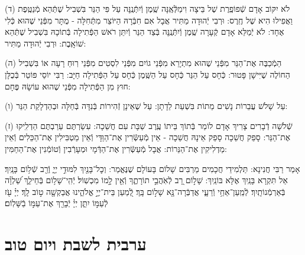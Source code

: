 \documentclass[twoside, openany, parskip=half, 11pt]{book}
\begin{document}
(ד) לֹא יִקּוֹב אָדָם שְֿׁפוֹפֶֽרֶת שֶׁל בֵּיצָה וִימַלְּֿאֶֽנָּה שֶֽׁמֶן וְֿיִתְּֿנֶֽנָּה עַל פִּי הַנֵּר בִּשְׁבִיל שֶׁתְּֿהֵא מְֿנַטֶּֽפֶת וַאֲפִילוּ הִיא שֶׁל חֶֽרֶס: וּרְבִי יְֿהוּדָה מַתִּיר אֲבָל אִם חִבְּֿרָהּ הַיּוֹצֵר מִתְּֿחִלָּה - מֻתָּר מִפְּֿנֵי שֶׁהוּא כְּֿלִי אֶחָד: לֹא יְֿמַלֵּא אָדָם קְֿעָרָה שֶֽׁמֶן וְֿיִתְּֿנֶֽנָּה בְּֿצַד הַנֵּר וְֿיִתֵּן רֹאשׁ הַפְּֿתִילָה בְּֿתוֹכָהּ בִּשְׁבִיל שֶׁתְּֿהֵא שׁוֹאָֽבֶת: וּרְבִי יְֿהוּדָה מַתִּיר:

(ה) הַמְֿכַבֶּה אֶת־הַנֵּר מִפְּֿנֵי שֶׁהוּא מִתְיָרֵא מִפְּֿנֵי גוֹיִם מִפְּֿנֵי לִסְטִים מִפְּֿנֵי רֽוּחַ רָעָה אוֹ בִּשְׁבִיל הַחוֹלֶה שֶׁיִּישָׁן פָּטוּר: כְּֿחָס עַל הַנֵּר כְּֿחָס עַל הַשֶּֽׁמֶן כְּֿחָס עַל הַפְּֿתִילָה חַיָּב: רַבִּי יוֹסֵי פּוֹטֵר בְּֿכֻלָּן חוּץ מִן הַפְּֿתִילָה מִפְּֿנֵי שֶׁהוּא עוֹשָׂהּ פֶּחָם:

(ו) עַל שָׁלֹשׁ עֲבֵרוֹת נָשִׁים מֵתוֹת בִּשְׁעַת לֵדָתָן: עַל שֶׁאֵינָן זְֿהִירוֹת בְּֿנִדָּה בְּֿחַלָּה וּבְהַדְלָקַת הַנֵּר:

(ז) שְֿׁלֹשָׁה דְֿבָרִים צָרִיךְ אָדָם לוֹמַר בְּֿתוֹךְ בֵּיתוֹ עֶֽרֶב שַׁבָּת עִם חֲשֵׁכָה: עִשַׂרְתֶּם עֵרַבְתֶּם הַדְלִֽיקוּ אֶת־הַנֵּר: סָפֵק חֲשֵׁכָה סָפֵק אֵינָהּ חֲשֵׁכָה - אֵין מְֿעַשְּֿׂרִין אֶת־הַוַּדָּי וְֿאֵין מַטְבִּילִין אֶת־הַכֵּלִים וְֿאֵין מַדְלִיקִין אֶת־הַנֵּרוֹת: אֲבָל מְֿעַשְּֿׂרִין אֶת־הַדְּֿמָי וּמְעָרְֿבִין וְֿטוֹמְֿנִין אֶת־הַחַמִּין:


 
אָמַר רַבִּי חֲנִינָא: תַּלְמִידֵי חֲכָמִים מַרְבִּים שָׁלוֹם בָּעוֹלָם שֶׁנֶּאֱמַר:
וְכׇל־בָּנַ֖יִךְ לִמּוּדֵ֣י יְיָ֑ וְֿרַ֖ב שְֿׁל֥וֹם בָּנָֽיִךְ׃ אַל תִּקְרָא בָּנַֽיִךְ אֶלָּא בּוֹנַֽיִךְ: שָׁל֣וֹם רָ֭ב לְֿאֹֽהֲבֵ֣י תוֹרָתֶ֑ךָ וְֿאֵ֖ין לָ֣מוֹ מִכְשֽׁוֹל׃ יְֿהִֽי־שָׁל֥וֹם בְּֿחֵילֵ֑ךְ שַׁ֝לְוָ֗ה בְּֿאַרְמְֿנוֹתָֽיִךְ׃ לְֿמַֽעַן־אַחַ֥י וְֿרֵעָ֑י אֲדַבְּֿרָה־נָּ֖א שָׁל֣וֹם בָּֽךְ׃ לְֿ֭מַעַן בֵּית־יְיָ֣ אֱלֹהֵ֑ינוּ אֲבַקְשָׁ֖ה ט֣וֹב לָֽךְ׃
יְיָ֗ עֹ֖ז לְֿעַמּ֣וֹ יִתֵּ֑ן יְיָ֓ יְֿבָרֵ֖ךְ אֶת־עַמּ֣וֹ בַֿשָּׁלֽוֹם׃


\mournerskaddish

\vspace{\baselineskip}

{\let\clearpage\relax
\chapter[ערבית לשבת ויו״ט]{ ערבית לשבת ויום טוב }}
\newcommand{\hamaarivaravim}{
	\firstword{בָּרוּךְ}
	אַתָּה יְיָ אֱלֹהֵֽינוּ מֶֽלֶךְ הָעוֹלָם אֲשֶׁר בִּדְבָרוֹ מַעֲרִיב עֲרָבִים בְּֿחׇכְמָה פּוֹתֵֽחַ שְֿׁעָרִים וּבִתְבוּנָה מְֿשַׁנֶּה עִתִּים וּמַחֲלִיף אֶת־הַזְּֿמַנִּים וּמְסַדֵּר אֶת־הַכּוֹכָבִים בְּֿמִשְׁמְֿרוֹתֵֽיהֶם בָּרָקִֽיעַ כִּרְצוֹנוֹ: בּוֹרֵא יוֹם וָלָֽיְֿלָה גּוֹלֵל אוֹר מִפְּֿנֵי חֹֽשֶׁךְ וְֿחֹֽשֶׁךְ מִפְּֿנֵי אוֹר: וּמַעֲבִיר יוֹם וּמֵֽבִיא לָֽיְֿלָה וּמַבְדִּיל בֵּין יוֹם וּבֵין לָֽיְֿלָה יְיָ צְֿבָאוֹת שְֿׁמוֹ: אֵל חַי וְֿקַיָּם תָּמִיד יִמְלוֹךְ עָלֵֽינוּ לְֿעוֹלָם וָעֶד: בָּרוּךְ אַתָּה יְיָ הַמַּעֲרִיב עֲרָבִים:
}
\end{document}
